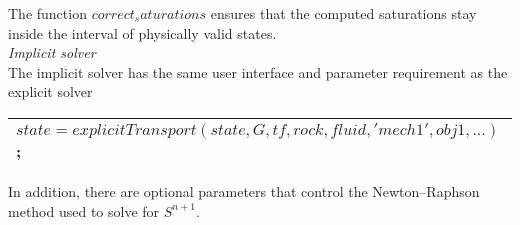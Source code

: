 \documentclass[a4paper,10pt]{report}
\begin{document}
The function $correct_saturations$ ensures that the computed saturations
stay inside the interval of physically valid states. \\
\emph{Implicit solver}\\
The implicit solver has the same user interface and parameter requirement as
the explicit solver
\begin{table}[!ht]
\centering
\begin{tabular}{ |l |} 
\hline
$state = explicitTransport(state, G, tf, rock, fluid, 'mech1', obj1, ...)$;\\
 \hline
\end{tabular}
\label{table:etransp}
\end{table} 
In addition, there are optional parameters that control the Newton–Raphson
method used to solve for $S ^{n+1}$. 
\end{document}
